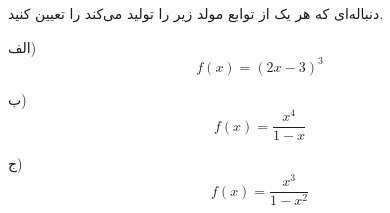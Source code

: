 \EXERCISE
دنباله‌ای که هر یک از توابع مولد زیر را تولید می‌کند را تعیین کنید.

الف)
$$f(x) = (2x - 3)^3$$

ب)
$$f(x) = \frac{x^4}{1-x}$$

ج)
$$f(x) = \frac{x^3}{1 - x^2}$$
